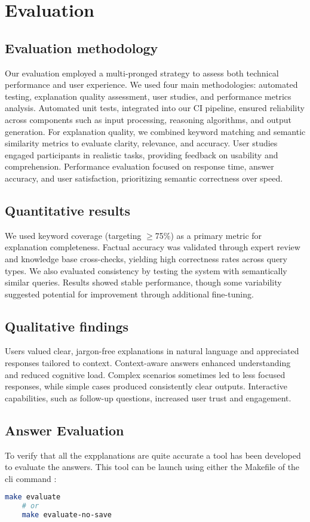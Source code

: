 \section{Evaluation}

\subsection{Evaluation methodology}

Our evaluation employed a multi-pronged strategy to assess both technical performance and user experience. We used four main methodologies: automated testing, explanation quality assessment, user studies, and performance metrics analysis.
Automated unit tests, integrated into our CI pipeline, ensured reliability across components such as input processing, reasoning algorithms, and output generation. For explanation quality, we combined keyword matching and semantic similarity metrics to evaluate clarity, relevance, and accuracy.
User studies engaged participants in realistic tasks, providing feedback on usability and comprehension. Performance evaluation focused on response time, answer accuracy, and user satisfaction, prioritizing semantic correctness over speed.

\subsection{Quantitative results}
We used keyword coverage (targeting $\geq$75\%) as a primary metric for explanation completeness. Factual accuracy was validated through expert review and knowledge base cross-checks, yielding high correctness rates across query types.
We also evaluated consistency by testing the system with semantically similar queries. Results showed stable performance, though some variability suggested potential for improvement through additional fine-tuning.
\subsection{Qualitative findings}

Users valued clear, jargon-free explanations in natural language and appreciated responses tailored to context. Context-aware answers enhanced understanding and reduced cognitive load.
Complex scenarios sometimes led to less focused responses, while simple cases produced consistently clear outputs. Interactive capabilities, such as follow-up questions, increased user trust and engagement.

\subsection{Answer Evaluation}
To verify that all the expplanations are quite accurate a tool has been developed to evaluate the answers. This tool can be launch using either the Makefile of the cli command :
\begin{lstlisting}[language=bash]
    make evaluate
    # or
    make evaluate-no-save
\end{lstlisting}


